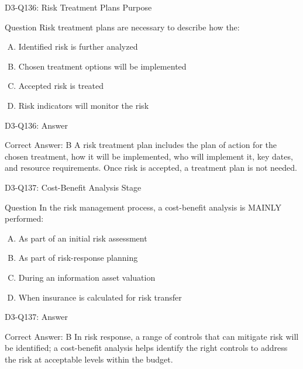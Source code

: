 \documentclass{beamer}
\begin{document}
	\begin{frame}{D3-Q136: Risk Treatment Plans Purpose}
		\begin{block}{Question}
			Risk treatment plans are necessary to describe how the:
		\end{block}
		\begin{enumerate}[(A)]
			\item Identified risk is further analyzed
			\item Chosen treatment options will be implemented
			\item Accepted risk is treated
			\item Risk indicators will monitor the risk
		\end{enumerate}
	\end{frame}
	\begin{frame}{D3-Q136: Answer}
		\begin{block}{Correct Answer: B}
			A risk treatment plan includes the plan of action for the chosen treatment, how it will be implemented, who will implement it, key dates, and resource requirements. Once risk is accepted, a treatment plan is not needed.
		\end{block}
	\end{frame}
	
	\begin{frame}{D3-Q137: Cost-Benefit Analysis Stage}
		\begin{block}{Question}
			In the risk management process, a cost-benefit analysis is MAINLY performed:
		\end{block}
		\begin{enumerate}[(A)]
			\item As part of an initial risk assessment
			\item As part of risk-response planning
			\item During an information asset valuation
			\item When insurance is calculated for risk transfer
		\end{enumerate}
	\end{frame}
	\begin{frame}{D3-Q137: Answer}
		\begin{block}{Correct Answer: B}
			In risk response, a range of controls that can mitigate risk will be identified; a cost-benefit analysis helps identify the right controls to address the risk at acceptable levels within the budget.
		\end{block}
	\end{frame}
	
\end{document}
